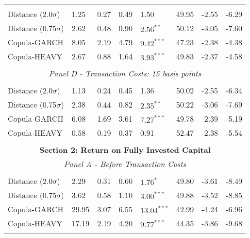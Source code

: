 \documentclass[a4paper,12pt]{report}
\begin{document}
\begin{refsection}
\begin{threeparttable}[H]
\begin{tabularx}{\textwidth}{@{\extracolsep{\fill}}llllllll@{}}
		&       &       &       &       &       &       &  \\
		Distance (2.0$\sigma$) & 1.25  & 0.27  & 0.49  & 1.50  & 49.95 & -2.55  & -6.29 \\
		Distance (0.75$\sigma$) & 2.62  & 0.48  & 0.90  & $2.56^{**}$  & 50.12 & -3.05  & -7.60 \\
		Copula-GARCH & 8.05  & 2.19  & 4.79  & $9.42^{***}$  & 47.23 & -2.38  & -4.38 \\
		Copula-HEAVY & 2.67  & 0.88  & 1.64  & $3.93^{***}$  & 49.83 & -2.37  & -4.58 \\
		\multicolumn{1}{r}{} & \multicolumn{1}{r}{} & \multicolumn{1}{r}{} & \multicolumn{1}{r}{} & \multicolumn{1}{r}{} & \multicolumn{1}{r}{} & \multicolumn{1}{r}{} & \multicolumn{1}{r}{} \\
		\multicolumn{8}{c}{\textit{Panel D - Transaction Costs: 15 basis points}} \\
		&       &       &       &       &       &       &  \\
		Distance (2.0$\sigma$) & 1.13  & 0.24  & 0.45  & 1.36  & 50.02 & -2.55  & -6.34 \\
		Distance (0.75$\sigma$) & 2.38  & 0.44  & 0.82  & $2.35^{**}$  & 50.22 & -3.06  & -7.69 \\
		Copula-GARCH & 6.08  & 1.69  & 3.61  & $7.27^{***}$  & 49.78 & -2.39  & -5.19 \\
		Copula-HEAVY & 0.58  & 0.19  & 0.37  & 0.91  & 52.47 & -2.38  & -5.54 \\
		\multicolumn{1}{r}{} & \multicolumn{1}{r}{} & \multicolumn{1}{r}{} & \multicolumn{1}{r}{} & \multicolumn{1}{r}{} & \multicolumn{1}{r}{} & \multicolumn{1}{r}{} & \multicolumn{1}{r}{} \\
		\midrule
		\multicolumn{8}{c}{\textbf{Section 2: Return on Fully Invested Capital}} \\
		\multicolumn{8}{c}{\textit{Panel A - Before Transaction Costs}} \\
		&       &       &       &       &       &       &  \\
		Distance (2.0$\sigma$) & 2.29 & 0.31 & 0.60 & $1.76^{*}$ & 49.80 & -3.61 & -8.49 \\
		Distance (0.75$\sigma$) & 3.62 & 0.58 & 1.10 & $3.00^{***}$ & 49.88 & -3.52 & -8.85 \\
		Copula-GARCH & 29.95 & 3.07 & 6.55 & $13.04^{***}$ & 42.99 & -4.24 & -6.96 \\
		Copula-HEAVY & 17.19 & 2.19 & 4.20 & $9.77^{***}$ & 44.35 & -3.86 & -9.68 \\
		\multicolumn{1}{r}{} & \multicolumn{1}{r}{} & \multicolumn{1}{r}{} & \multicolumn{1}{r}{} & \multicolumn{1}{r}{} & \multicolumn{1}{r}{} & \multicolumn{1}{r}{} & \multicolumn{1}{r}{} \\

\end{tabularx}
\end{threeparttable}
\end{refsection}
\end{document}

